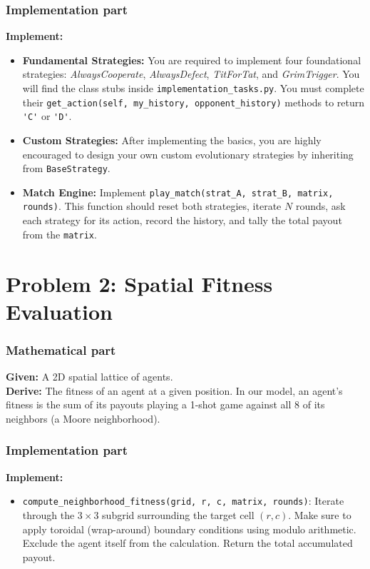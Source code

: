 \documentclass[11pt]{article}
\begin{document}
\subsubsection*{Implementation part}
\textbf{Implement:}
\begin{itemize}
    \item \textbf{Fundamental Strategies:} You are required to implement four foundational strategies: \textit{AlwaysCooperate}, \textit{AlwaysDefect}, \textit{TitForTat}, and \textit{GrimTrigger}. You will find the class stubs inside \lstinline|implementation_tasks.py|. You must complete their \lstinline|get_action(self, my_history, opponent_history)| methods to return \lstinline|'C'| or \lstinline|'D'|.
    \item \textbf{Custom Strategies:} After implementing the basics, you are highly encouraged to design your own custom evolutionary strategies by inheriting from \lstinline|BaseStrategy|.
    \item \textbf{Match Engine:} Implement \lstinline|play_match(strat_A, strat_B, matrix, rounds)|. This function should reset both strategies, iterate $N$ rounds, ask each strategy for its action, record the history, and tally the total payout from the \lstinline|matrix|.
\end{itemize}

\section*{Problem 2: Spatial Fitness Evaluation}

\subsubsection*{Mathematical part}
\textbf{Given:} A 2D spatial lattice of agents. \\
\textbf{Derive:} The fitness of an agent at a given position. In our model, an agent's fitness is the sum of its payouts playing a 1-shot game against all 8 of its neighbors (a Moore neighborhood).

\subsubsection*{Implementation part}
\textbf{Implement:}
\begin{itemize}
    \item \lstinline|compute_neighborhood_fitness(grid, r, c, matrix, rounds)|: Iterate through the $3 \times 3$ subgrid surrounding the target cell $(r, c)$. Make sure to apply toroidal (wrap-around) boundary conditions using modulo arithmetic. Exclude the agent itself from the calculation. Return the total accumulated payout.
\end{itemize}
\end{document}
